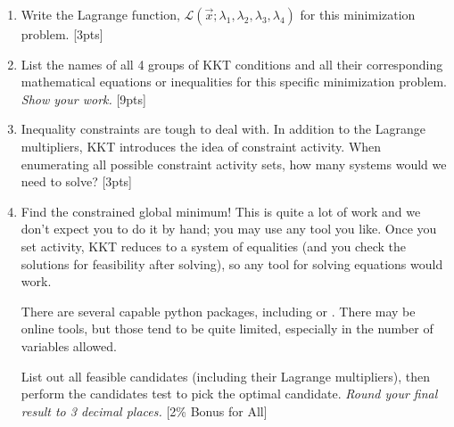 \begin{enumerate}[label=\alph*.]
    \item Write the Lagrange function, $\mathcal{L}(\vec{x}; \lambda_1, \lambda_2, \lambda_3, \lambda_4)$ for this minimization problem. [3pts] %

    \item List the names of all 4 groups of KKT conditions and all their corresponding mathematical equations or inequalities for this specific minimization problem. \emph{Show your work.} [9pts]

    \item Inequality constraints are tough to deal with. In addition to the Lagrange multipliers, KKT introduces the idea of constraint activity. When enumerating all possible constraint activity sets, how many systems would we need to solve? [3pts] %

    \item Find the constrained global minimum! This is quite a lot of work and we don't expect you to do it by hand; you may use any tool you like. Once you set activity, KKT reduces to a system of equalities (and you check the solutions for feasibility after solving), so any tool for solving equations would work.

    \smallskip There are several capable python packages, including  or . There may be online tools, but those tend to be quite limited, especially in the number of variables allowed.

    \smallskip List out all feasible candidates (including their Lagrange multipliers), then perform the candidates test to pick the optimal candidate. \emph{Round your final result to 3 decimal places.} [2\% Bonus for All]
\end{enumerate}


\newpage
